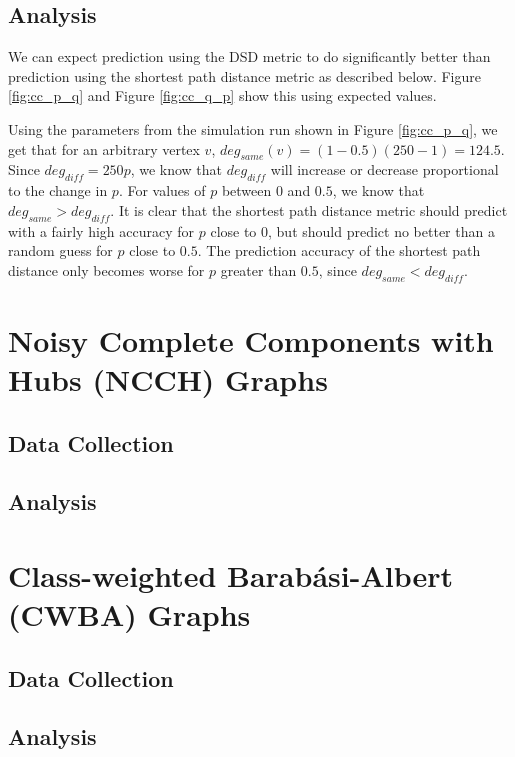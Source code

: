 \subsection{Analysis}
We can expect prediction using the DSD metric to do significantly better than prediction using the shortest path distance metric as described below. Figure \ref{fig:cc_p_q} and Figure \ref{fig:cc_q_p} show this using expected values.

Using the parameters from the simulation run shown in Figure \ref{fig:cc_p_q}, we get that for an arbitrary vertex $v$, $deg_{same}(v) = (1-0.5)(250-1) = 124.5$. Since $deg_{diff} = 250p$, we know that $deg_{diff}$ will increase or decrease proportional to the change in $p$. For values of $p$ between $0$ and $0.5$, we know that $deg_{same} > deg_{diff}$. It is clear that the shortest path distance metric should predict with a fairly high accuracy for $p$ close to $0$, but should predict no better than a random guess for $p$ close to $0.5$. The prediction accuracy of the shortest path distance only becomes worse for $p$ greater than $0.5$, since $deg_{same} < deg_{diff}$.

\section{Noisy Complete Components with Hubs (NCCH) Graphs}
\subsection{Data Collection}
\subsection{Analysis}

\section{Class-weighted Barab\'{a}si-Albert (CWBA) Graphs}
\subsection{Data Collection}
\subsection{Analysis}